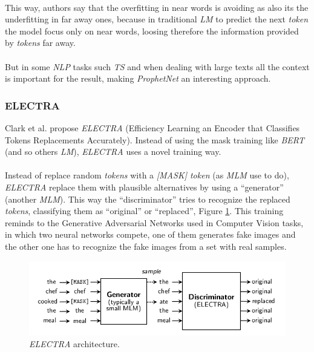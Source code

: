 \paragraph{}
This way, authors say that the overfitting in near words is avoiding as also its the underfitting in far away ones, because in traditional \emph{LM} to predict the next \emph{token} the model focus only on near words, loosing therefore the information provided by \emph{tokens} far away.
\paragraph{}
But in some \emph{NLP} tasks  such \emph{TS} and when dealing with large texts all the context is important for the result, making \emph{ProphetNet} an interesting approach.
\subsubsection{ELECTRA}
Clark et al. propose \emph{ELECTRA} (Efficiency Learning an Encoder that Classifies Tokens Replacements Accurately).\cite{Clark2020} Instead of using the mask training like \emph{BERT} (and so others \emph{LM}), \emph{ELECTRA} uses a novel training way.
\paragraph{}
Instead of replace random \emph{tokens} with a \emph{[MASK] token} (as \emph{MLM} use to do), \emph{ELECTRA} replace them with plausible alternatives by using a ``generator'' (another \emph{MLM}). This way the ``discriminator'' tries to recognize the replaced \emph{tokens}, classifying them as ``original'' or ``replaced'', Figure \ref{fig:electra}. This training reminds to the Generative Adversarial Networks used in Computer Vision tasks, in which two neural networks compete, one of them generates fake images and the other one has to recognize the fake images from a set with real samples.
\begin{figure}[h!]
	\centering
	\includegraphics[scale=0.45]{images/electra}
	\caption{\emph{ELECTRA} architecture.}
	\label{fig:electra}
\end{figure}
